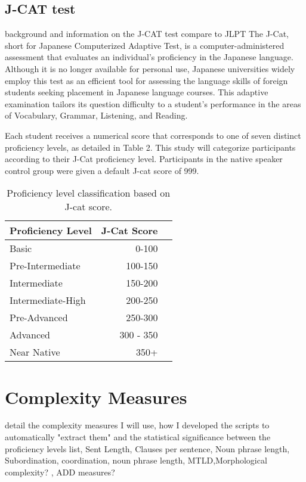 \subsection{J-CAT test}
background and information on the J-CAT test compare to JLPT
The J-Cat, short for Japanese Computerized Adaptive Test, is a computer-administered assessment that evaluates an individual's proficiency in the Japanese language. Although it is no longer available for personal use, Japanese universities widely employ this test as an efficient tool for assessing the language skills of foreign students seeking placement in Japanese language courses. This adaptive examination tailors its question difficulty to a student's performance in the areas of Vocabulary, Grammar, Listening, and Reading.

Each student receives a numerical score that corresponds to one of seven distinct proficiency levels, as detailed in Table 2. This study will categorize participants according to their J-Cat proficiency level. Participants in the native speaker control group were given a default J-cat score of 999.

\begin{table}
\centering
\begin{tabular}{lrl}
\hline \textbf{Proficiency Level} & \textbf{J-Cat Score} \\ \hline
Basic & 0-100 \\
Pre-Intermediate & 100-150 \\
Intermediate & 150-200 \\
Intermediate-High & 200-250 \\
Pre-Advanced & 250-300 \\
Advanced & 300 - 350 \\
Near Native & 350+\\
\hline
\end{tabular}
\caption{\label{proficency-table} Proficiency level classification based on J-cat score.  }
\end{table}


\section{Complexity Measures}
detail the complexity measures I will use, how I developed the scripts to automatically "extract them" and the statistical significance between the proficiency levels
list, Sent Length, Clauses per sentence, Noun phrase length,  Subordination, coordination, noun phrase length, MTLD,Morphological complexity? , ADD measures?


